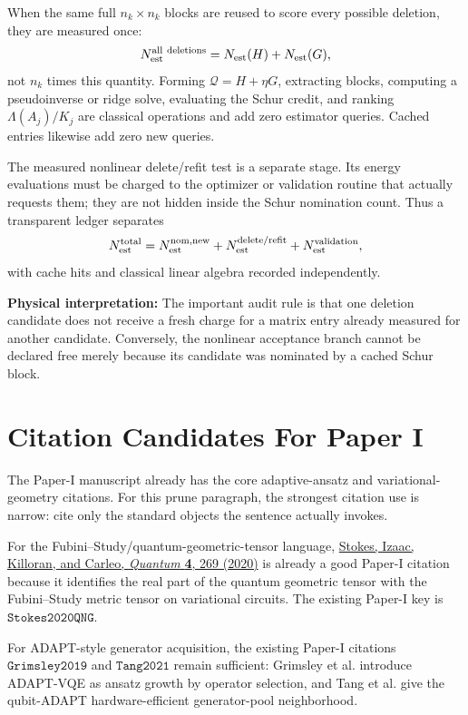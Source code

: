 \documentclass[10pt,twocolumn]{article}
\newcommand{\blocktitle}[1]{\vspace{2pt}\noindent\textbf{#1}\space}
\newcommand{\phys}[1]{\blocktitle{Physical interpretation:} #1}
\begin{document}
When the same full \(n_k\times n_k\) blocks are reused to score every possible deletion, they are measured once:
\[
N_{\rm est}^{\rm all\ deletions}
=
N_{\rm est}(H)+N_{\rm est}(G),
\]
not \(n_k\) times this quantity. Forming \(\mathcal Q=H+\eta G\), extracting blocks, computing a pseudoinverse or ridge solve, evaluating the Schur credit, and ranking \(\Lambda(A_j)/K_j\) are classical operations and add zero estimator queries. Cached entries likewise add zero new queries.

The measured nonlinear delete/refit test is a separate stage. Its energy evaluations must be charged to the optimizer or validation routine that actually requests them; they are not hidden inside the Schur nomination count. Thus a transparent ledger separates
\[
N_{\rm est}^{\rm total}
=
N_{\rm est}^{\rm nom,new}
+
N_{\rm est}^{\rm delete/refit}
+
N_{\rm est}^{\rm validation},
\]
with cache hits and classical linear algebra recorded independently.

\phys{The important audit rule is that one deletion candidate does not receive a fresh charge for a matrix entry already measured for another candidate. Conversely, the nonlinear acceptance branch cannot be declared free merely because its candidate was nominated by a cached Schur block.}

\section*{Citation Candidates For Paper I}

The Paper-I manuscript already has the core adaptive-ansatz and variational-geometry citations. For this prune paragraph, the strongest citation use is narrow: cite only the standard objects the sentence actually invokes.

For the Fubini--Study/quantum-geometric-tensor language, \href{https://quantum-journal.org/papers/q-2020-05-25-269/}{Stokes, Izaac, Killoran, and Carleo, \emph{Quantum} \textbf{4}, 269 (2020)} is already a good Paper-I citation because it identifies the real part of the quantum geometric tensor with the Fubini--Study metric tensor on variational circuits. The existing Paper-I key is \(\texttt{Stokes2020QNG}\).

For ADAPT-style generator acquisition, the existing Paper-I citations \(\texttt{Grimsley2019}\) and \(\texttt{Tang2021}\) remain sufficient: Grimsley et al. introduce ADAPT-VQE as ansatz growth by operator selection, and Tang et al. give the qubit-ADAPT hardware-efficient generator-pool neighborhood.
\end{document}
